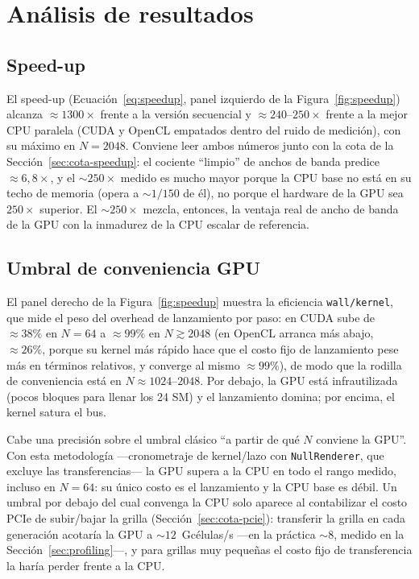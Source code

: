 \documentclass[
	spanish,
	letterpaper, oneside
]{article}
\begin{document}
\section{Análisis de resultados}
\label{sec:analisis}

\subsection{Speed-up}
\label{sec:speedup}

El speed-up (Ecuación~\ref{eq:speedup}, panel izquierdo de la
Figura~\ref{fig:speedup}) alcanza $\approx 1300\times$ frente a la versión secuencial
y $\approx 240$--$250\times$ frente a la mejor CPU paralela (CUDA y OpenCL empatados
dentro del ruido de medición), con su máximo en $N=2048$. Conviene leer ambos números junto con la
cota de la Sección~\ref{sec:cota-speedup}: el cociente ``limpio'' de anchos de banda
predice $\approx 6{,}8\times$, y el $\sim 250\times$ medido es mucho mayor porque la
CPU base no está en su techo de memoria (opera a $\sim 1/150$ de él), no porque el
hardware de la GPU sea $250\times$ superior. El $\sim 250\times$ mezcla, entonces, la
ventaja real de ancho de banda de la GPU con la inmadurez de la CPU escalar de
referencia.


\subsection{Umbral de conveniencia GPU}
\label{sec:umbral}

El panel derecho de la Figura~\ref{fig:speedup} muestra la eficiencia
\texttt{wall/kernel}, que mide el peso del overhead de lanzamiento por paso:
en CUDA sube de $\approx 38\%$ en $N=64$ a $\approx 99\%$ en $N \gtrsim 2048$ (en
OpenCL arranca más abajo, $\approx 26\%$, porque su kernel más rápido hace que
el costo fijo de lanzamiento pese más en términos relativos, y converge al mismo
$\approx 99\%$), de modo que la rodilla de conveniencia está en $N \approx
1024$--$2048$. Por debajo, la GPU
está infrautilizada (pocos bloques para llenar los 24 SM) y el lanzamiento domina; por
encima, el kernel satura el bus.

Cabe una precisión sobre el umbral clásico ``a partir de qué $N$ conviene la GPU''.
Con esta metodología ---cronometraje de kernel/lazo con \texttt{NullRenderer}, que
excluye las transferencias--- la GPU supera a la CPU en todo el rango
medido, incluso en $N=64$: su único costo es el lanzamiento y la CPU base es débil. Un
umbral por debajo del cual convenga la CPU solo aparece al contabilizar el costo PCIe
de subir/bajar la grilla (Sección~\ref{sec:cota-pcie}): transferir la grilla en cada
generación acotaría la GPU a $\sim 12$~Gcélulas/s ---en la práctica $\sim$8, medido en
la Sección~\ref{sec:profiling}---, y para grillas muy pequeñas el costo
fijo de transferencia la haría perder frente a la CPU.
\end{document}
